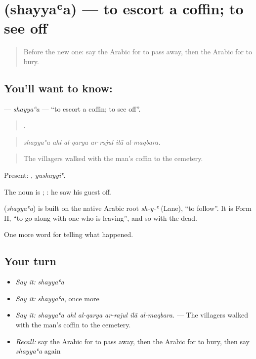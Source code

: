 \section[\texorpdfstring{\ar{شيع} (shayyaʿa)}{شيع (shayyaʿa)}]{ (shayyaʿa) — to escort a coffin; to see off}

\label{lesson:AR-C314-shayyaa}



\begin{quote}
Before the new one: say the Arabic for to pass away, then the Arabic for to bury.
\end{quote}

\subsection*{You'll want to know: }
\textbf{} — \emph{shayyaʿa} — \textquotedblleft{}to escort a coffin; to see off\textquotedblright{}.

\begin{quote}
     .
\end{quote}

\begin{quote}
\emph{shayyaʿa ahl al-qarya ar-rajul ilā al-maqbara.}
\end{quote}

\begin{quote}
The villagers walked with the man’s coffin to the cemetery.
\end{quote}

Present: , \emph{yushayyiʿ}.

The noun is ;  : he saw his guest off.

\begin{cousinweb}
\textbf{} (\emph{shayyaʿa}) is built on the native Arabic root \emph{sh-y-ʿ} (Lane), \textquotedblleft{}to follow\textquotedblright{}. It is Form II, \textquotedblleft{}to go along with one who is leaving\textquotedblright{}, and so with the dead.
\end{cousinweb}

\begin{grammarlens}[title={What you've built}]
One more word for telling what happened.
\end{grammarlens}

\subsection*{Your turn}
\begin{itemize}
\raggedright
  \item \emph{Say it:} \emph{shayyaʿa}
  \item \emph{Say it:} \emph{shayyaʿa}, once more
  \item \emph{Say it:} \emph{shayyaʿa ahl al-qarya ar-rajul ilā al-maqbara.} — The villagers walked with the man’s coffin to the cemetery.
  \item \emph{Recall:} say the Arabic for to pass away, then the Arabic for to bury, then say \emph{shayyaʿa} again
\end{itemize}

